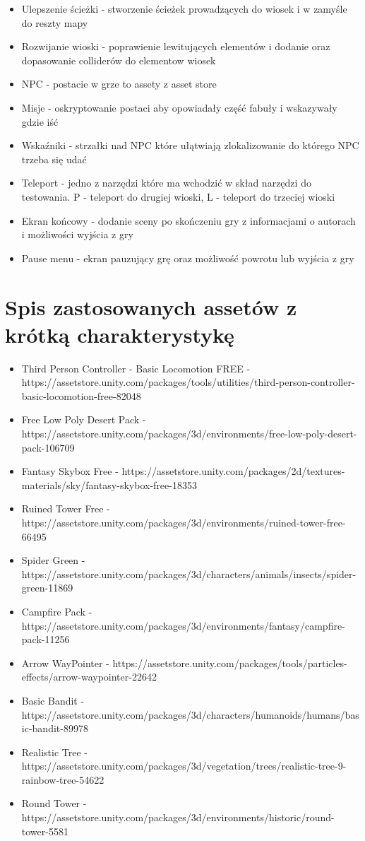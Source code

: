 \documentclass[10pt,a4paper]{article}
\begin{document}
\begin{description}
\begin{itemize}
  	  \item Ulepszenie ścieżki - stworzenie ścieżek prowadzących do wiosek i w zamyśle do reszty mapy 
	  \item Rozwijanie wioski - poprawienie lewitujących elementów i dodanie oraz dopasowanie colliderów do elementow wiosek
	  \item NPC - postacie w grze to assety z asset store
	  \item Misje - oskryptowanie postaci aby opowiadały część fabuły i wskazywały gdzie iść
	  \item Wskaźniki - strzałki nad NPC które ułątwiają zlokalizowanie do którego NPC trzeba się udać
	  \item Teleport - jedno z narzędzi które ma wchodzić w skład narzędzi do testowania. P - teleport do drugiej wioski, L - teleport do trzeciej wioski
	  \item Ekran końcowy - dodanie sceny po skończeniu gry z informacjami o autorach i możliwości wyjścia z gry
	  \item Pause menu - ekran pauzujący grę oraz możliwość powrotu lub wyjścia z gry
	  
	\end{itemize}
\end{description}

\clearpage
\section{Spis zastosowanych assetów z krótką charakterystykę}
\begin{itemize}
  \item Third Person Controller - Basic Locomotion FREE - https://assetstore.unity.com/packages/tools/utilities/third-person-controller-basic-locomotion-free-82048
  \item Free Low Poly Desert Pack - https://assetstore.unity.com/packages/3d/environments/free-low-poly-desert-pack-106709
  \item Fantasy Skybox Free - https://assetstore.unity.com/packages/2d/textures-materials/sky/fantasy-skybox-free-18353
  \item Ruined Tower Free - https://assetstore.unity.com/packages/3d/environments/ruined-tower-free-66495
  \item Spider Green - https://assetstore.unity.com/packages/3d/characters/animals/insects/spider-green-11869
  \item Campfire Pack - https://assetstore.unity.com/packages/3d/environments/fantasy/campfire-pack-11256
  \item Arrow WayPointer - https://assetstore.unity.com/packages/tools/particles-effects/arrow-waypointer-22642
  \item Basic Bandit - https://assetstore.unity.com/packages/3d/characters/humanoids/humans/basic-bandit-89978
  \item Realistic Tree - https://assetstore.unity.com/packages/3d/vegetation/trees/realistic-tree-9-rainbow-tree-54622
  \item Round Tower - https://assetstore.unity.com/packages/3d/environments/historic/round-tower-5581
\end{itemize}
\end{document}
